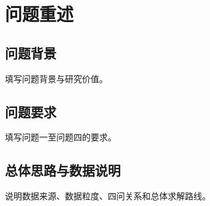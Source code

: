 \section{问题重述}

\subsection{问题背景}
填写问题背景与研究价值。

\subsection{问题要求}
填写问题一至问题四的要求。

\subsection{总体思路与数据说明}
说明数据来源、数据粒度、四问关系和总体求解路线。
